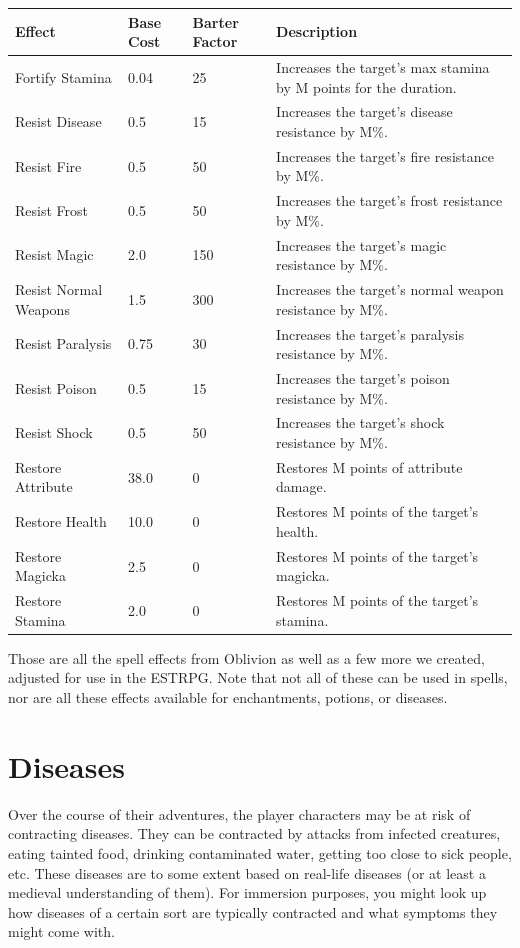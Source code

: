 \documentclass[12pt]{book}
\begin{document}
\begin{tabular}{p{}|p{}|p{}|p{}}
Effect & Base Cost & Barter Factor & Description\\ \hline
Fortify Stamina & 0.04 & 25 & Increases the target's max stamina by M points for the duration.\\ \hline
Resist Disease & 0.5 & 15 & Increases the target's disease resistance by M\%.\\ \hline
Resist Fire & 0.5 & 50 & Increases the target's fire resistance by M\%.\\ \hline
Resist Frost & 0.5 & 50 & Increases the target's frost resistance by M\%.\\ \hline
Resist Magic & 2.0 & 150 & Increases the target's magic resistance by M\%.\\ \hline
Resist Normal Weapons & 1.5 & 300 & Increases the target's normal weapon resistance by M\%.\\ \hline
Resist Paralysis & 0.75 & 30 & Increases the target's paralysis resistance by M\%.\\ \hline
Resist Poison & 0.5 & 15 & Increases the target's poison resistance by M\%.\\ \hline
Resist Shock & 0.5 & 50 & Increases the target's shock resistance by M\%.\\ \hline
Restore Attribute & 38.0 & 0 & Restores M points of attribute damage.\\ \hline
Restore Health & 10.0 & 0 & Restores M points of the target's health.\\ \hline
Restore Magicka & 2.5 & 0 & Restores M points of the target's magicka.\\ \hline
Restore Stamina & 2.0 & 0 & Restores M points of the target's stamina.\\
\end{tabular}

Those are all the spell effects from Oblivion as well as a few more we created, adjusted for use in the ESTRPG. Note that not all of these can be used in spells, nor are all these effects available for enchantments, potions, or diseases.

\chapter{Diseases}
Over the course of their adventures, the player characters may be at risk of contracting diseases. They can be contracted by attacks from infected creatures, eating tainted food, drinking contaminated water, getting too close to sick people, etc. These diseases are to some extent based on real-life diseases (or at least a medieval understanding of them). For immersion purposes, you might look up how diseases of a certain sort are typically contracted and what symptoms they might come with.
\end{document}
